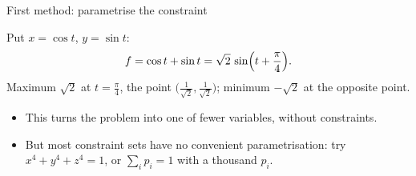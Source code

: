 \documentclass[10pt]{wosm-slides}
\begin{document}
\begin{frame}{First method: parametrise the constraint}
  \begin{example}[$f(x, y) = x + y$ on the circle $x^2 + y^2 = 1$]
    Put $x = \cos t$, $y = \sin t$:
    \[ f = \cos t + \sin t = \sqrt2\, \sin\Bigl(t + \frac\pi4\Bigr) . \]
    Maximum $\sqrt2$ at $t = \frac\pi4$, the point $\bigl(\frac1{\sqrt2}, \frac1{\sqrt2}\bigr)$; minimum
    $-\sqrt2$ at the opposite point.
  \end{example}
  \pause
  \begin{itemize}
    \item This turns the problem into one of fewer variables, without constraints.
    \item But most constraint sets have no convenient parametrisation: try
      $x^4 + y^4 + z^4 = 1$, or $\sum_i p_i = 1$ with a thousand $p_i$.
  \end{itemize}
\end{frame}
\end{document}
